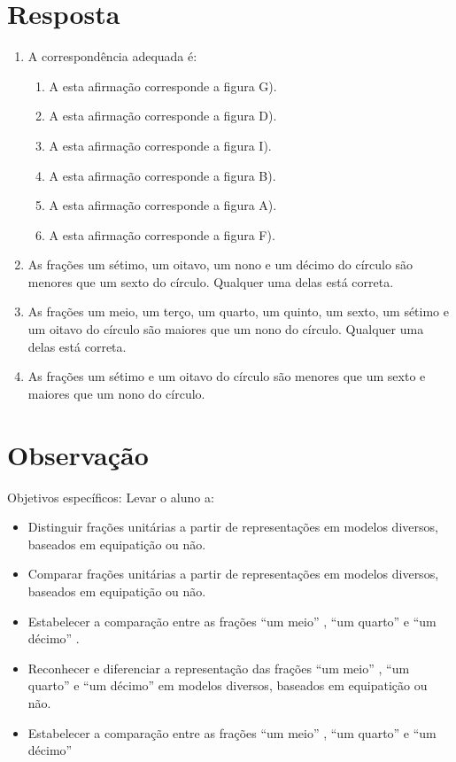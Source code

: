 \documentclass{book}
\begin{document}
  



\section{Resposta}  
\begin{enumerate} [\quad a)] %
    \item       A correspondência adequada é:      
\begin{enumerate} [\quad I)] %
        \item           A esta afirmação corresponde a figura G).
        \item           A esta afirmação corresponde a figura D).
        \item           A esta afirmação corresponde a figura I).
        \item           A esta afirmação corresponde a figura B).
        \item           A esta afirmação corresponde a figura A).
        \item           A esta afirmação corresponde a figura F).
\end{enumerate} %

    \item       As frações um sétimo, um oitavo, um nono e um décimo do círculo são menores que um sexto do círculo. Qualquer uma delas está correta.
    \item       As frações um meio, um terço, um quarto, um quinto, um sexto, um sétimo e um oitavo do círculo são maiores que um nono do círculo. Qualquer uma delas está correta.
    \item       As frações um sétimo e um oitavo do círculo são menores que um sexto e maiores que um nono do círculo.
\end{enumerate} %
  



\section{Observação}  
  
  Objetivos específicos: Levar o aluno a:  
\begin{itemize} %
    \item       Distinguir frações unitárias a partir de representações em modelos diversos, baseados em equipatição ou não. 
    \item       Comparar frações unitárias a partir de representações em modelos diversos, baseados em equipatição ou não.
    \item       Estabelecer a comparação entre as frações       ``um meio''      ,       ``um quarto''       e       ``um décimo''      . 
    \item       Reconhecer e diferenciar a representação das frações       ``um meio''      ,       ``um quarto''       e       ``um décimo''       em modelos diversos, baseados em equipatição ou não.
    \item       Estabelecer a comparação entre as frações       ``um meio''      ,       ``um quarto''       e       ``um décimo''       
\end{itemize} %
  
\end{document}
